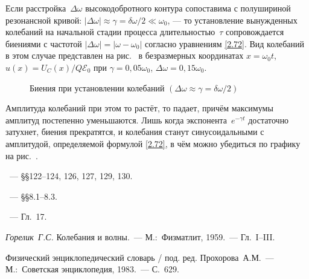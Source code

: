 Если расстройка~$\Delta\omega$ высокодобротного контура сопоставима с полушириной резонансной кривой: $|\Delta\omega|\approx\gamma=\delta\omega/2\ll\omega_0$, --- то установление вынужденных колебаний на
начальной стадии процесса длительностью~$\tau$ сопровождается биениями с
частотой $|\Delta\omega|=|\omega-\omega_0|$ согласно уравнениям \eqref{2.72}.
Вид колебаний в этом случае представлен на рис.~ в безразмерных координатах $x = \omega_0t$, $u(x) = U_C(x)/Q\mathcal{E}_0$ при $\gamma = 0,05\omega_0$, $\Delta \omega = 0,15\omega_0$.

\begin{figure}[h!]
	\centering
	\caption{Биения при установлении колебаний
$(\Delta\omega\approx\gamma=\delta\omega/2)$}
\end{figure}

Амплитуда колебаний при этом то растёт, то падает, причём максимумы амплитуд
постепенно уменьшаются. Лишь когда экспонента~$e^{-\gamma t}$ достаточно
затухнет, биения прекратятся, и колебания станут синусоидальными с амплитудой, определяемой формулой \eqref{2.72}, в чём можно убедиться по графику на рис.~.



\begin{lab:literature}
	\item \SivuhinIII~--- \S\S122--124, 126, 127, 129, 130.
	\item \KingLokOlh~--- \S\S8.1--8.3.
	\item \Kirichenko~--- Гл.~17.
	\item \textit{Горелик~Г.С.} Колебания и волны.~--- М.:~Физматлит,
1959.~--- Гл.~I--III.
	\item Физический энциклопедический словарь / под. ред. Прохорова~А.М.~--- 
    М.:~Советская энциклопедия, 1983.~--- С.~629.
\end{lab:literature}
